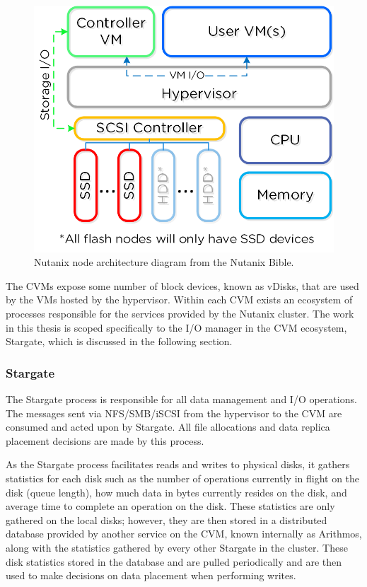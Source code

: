 \documentclass[12pt]{article}
\begin{document}
    \begin{figure}[htbp]
      \centering
      \includegraphics[scale=1.0]{images/converged_platform.png} 
      \caption{Nutanix node architecture diagram from the Nutanix
               Bible\cite{bible}.}
      \label{fig:adsf_architecture}
    \end{figure}

    The CVMs expose some number of block devices, known as vDisks, that are
    used by the VMs hosted by the hypervisor. Within each CVM exists an
    ecosystem of processes responsible for the services provided by the Nutanix
    cluster. The work in this thesis is scoped specifically to the I/O manager
    in the CVM ecosystem, Stargate, which is discussed in the following
    section.

    \subsubsection{Stargate} \label{section-stargate}

    The Stargate process is responsible for all data management and I/O
    operations. The messages sent via NFS/SMB/iSCSI from the hypervisor to the
    CVM are consumed and acted upon by Stargate. All file allocations and data
    replica placement decisions are made by this process.

    As the Stargate process facilitates reads and writes to physical disks, it
    gathers statistics for each disk such as the number of operations currently
    in flight on the disk (queue length), how much data in bytes currently
    resides on the disk, and average time to complete an operation on the disk.
    These statistics are only gathered on the local disks; however, they are
    then stored in a distributed database provided by another service on the
    CVM, known internally as Arithmos, along with the statistics gathered by
    every other Stargate in the cluster. These disk statistics stored in the
    database and are pulled periodically and are then used to make decisions on
    data placement when performing writes.
\end{document}
